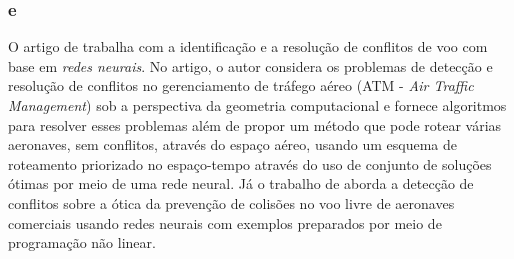 
\subsubsection{ e }
O artigo de  trabalha com a identificação e a resolução de conflitos de voo com base em \textit{redes neurais}. No artigo, o autor considera os problemas de detecção e resolução de conflitos no gerenciamento de tráfego aéreo (ATM - \textit{Air Traffic Management}) sob a perspectiva da geometria computacional e fornece algoritmos para resolver esses problemas além de propor um método que pode rotear várias aeronaves, sem conflitos, através do espaço aéreo, usando um esquema de roteamento priorizado no espaço-tempo através do uso de conjunto de soluções ótimas por meio de uma rede neural. Já o trabalho de  aborda a detecção de conflitos sobre a ótica da prevenção de colisões no voo livre de aeronaves comerciais usando redes neurais com exemplos preparados por meio de programação não linear. 




